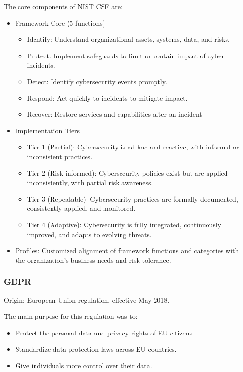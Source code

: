 The core components of NIST CSF are:

\begin{itemize}
    \item Framework Core (5 functions)
        \begin{itemize}
            \item Identify: Understand organizational assets, systems, data, and risks.
            \item Protect: Implement safeguards to limit or contain impact of cyber incidents.
            \item Detect: Identify cybersecurity events promptly.
            \item Respond: Act quickly to incidents to mitigate impact.
            \item Recover: Restore services and capabilities after an incident
        \end{itemize}
    \item Implementation Tiers
        \begin{itemize}
            \item Tier 1 (Partial): Cybersecurity is ad hoc and reactive, with informal or inconsistent practices.
            \item Tier 2 (Risk-informed): Cybersecurity policies exist but are applied inconsistently, with partial risk awareness.
            \item Tier 3 (Repeatable): Cybersecurity practices are formally documented, consistently applied, and monitored.
            \item Tier 4 (Adaptive): Cybersecurity is fully integrated, continuously improved, and adapts to evolving threats.
        \end{itemize}
    \item Profiles: Customized alignment of framework functions and categories with the organization’s business needs and risk tolerance.
\end{itemize}

\subsubsection{GDPR}

\indent 

Origin: European Union regulation, effective May 2018.

The main purpose for this regulation was to:

\begin{itemize}
    \item Protect the personal data and privacy rights of EU citizens.
    \item Standardize data protection laws across EU countries.
    \item Give individuals more control over their data.
\end{itemize}

